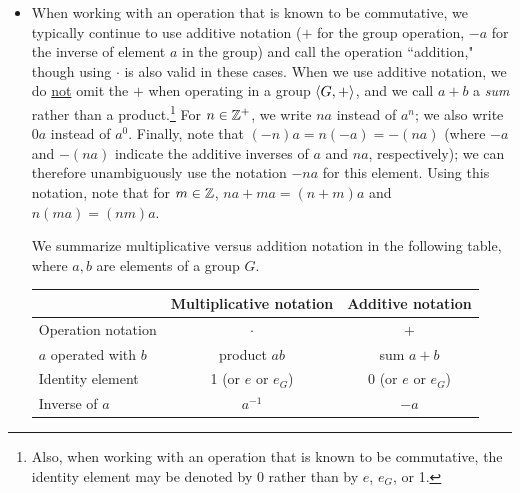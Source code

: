 \begin{itemize}
\item When working with an operation that is known to be commutative, we typically
continue to use additive notation ($+$ for the group operation, $-a$
for the inverse of element $a$ in the group) and call the operation
``addition," though using $\cdot$ is also valid in these cases. When
we use additive notation, we do \underline{not} omit the $+$ when
operating in a group $\langle G,+\rangle$, and we call $a+b$ a \textit{sum} rather
than a product.\footnote{Also, when working with an operation that is known to be commutative, the identity element may be denoted by 0 rather than by $e$, $e_G$, or 1.}  For $n\in \mathbb{Z}^+$, we write $na$ instead of $a^n$; we also write $0a$ instead of $a^0$. Finally, note that
$(-n)a=n(-a)=-(na)$ (where $-a$ and $-(na)$ indicate the
additive inverses of $a$ and $na$, respectively); we can therefore
unambiguously use the notation $-na$ for this element.
Using this notation, note that for $m\in \mathbb{Z}$, $na+ma=(n+m)a$ and $n(ma)=(nm)a$.

\bigskip
{}

We summarize multiplicative versus addition notation in the following table, where $a,b$ are elements of a group $G$.


\begin{center}
\begin{threeparttable}
\renewcommand{\arraystretch}{1.3}
\begin{tabular}{|l|c|c|}
\hline
 & \textbf{Multiplicative notation\tnote{*}}& \textbf{Additive notation\tnote{$\dagger$}}\\
\hline
Operation notation& $\cdot$ & +\\
$a$ operated with $b$ & product $ab$ & sum $a+b$\\
Identity element & 1 (or $e$ or $e_G$) & 0 (or $e$ or $e_G$)\\
Inverse of $a$ & $a^{-1}$ & $-a$\\
\hline
\end{tabular}

\end{threeparttable}
\end{center}



\end{itemize}
